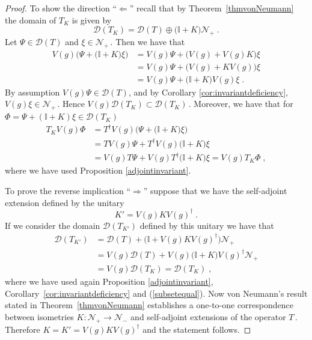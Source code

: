 \documentclass[a4paper,12pt]{amsart}
\newcommand{\D}{\mathcal{D}}
\newcommand{\1}{\mathbb{I}}
\numberwithin{equation}{section}
\numberwithin{theorem}{section}
\begin{document}
\begin{proof}%
To show the direction ``$\Leftarrow$'' recall that by
Theorem~\ref{thmvonNeumann} the domain of $T_K$ is given by
$$\D(T_K)=\D(T)\oplus\bigl(\mathbb{I}+K \bigr)\mathcal{N}_+\;.$$ Let $\Psi\in\D(T)$ and $\xi\in\mathcal{N}_+$\,. Then we have that
\begin{align*}
V(g)\bigl( \Psi + \bigl(\mathbb{I}+K\bigr)\xi \bigr)&=V(g)\Psi+ \bigl(V(g)+V(g)K\bigr)\xi\\
&=V(g)\Psi + \bigl(V(g)+KV(g)\bigr)\xi\\
&=V(g)\Psi+ \bigl(\mathbb{I}+K\bigr)V(g)\xi\;.
\end{align*}
By assumption $V(g)\Psi\in\D(T)$, and by Corollary \ref{cor:invariantdeficiency}, $V(g)\xi\in\mathcal{N_+}$\,. Hence $V(g)\D(T_K)\subset\D(T_K )$\,.
Moreover, we have that for $\Phi=\Psi+(\mathbb{I}+K)\xi\in\mathcal{D}(T_K)$
\begin{align*}
T_KV(g)\Phi&=T^\dagger V(g)\bigl(\Psi+\bigl(\mathbb{I}+K\bigr)\xi\bigr)\\
&=TV(g)\Psi+T^\dagger V(g)\bigl(\mathbb{I}+K\bigr)\xi\\
&=V(g)T\Psi + V(g)T^\dagger\bigl(\mathbb{I}+K\bigr)\xi=V(g)T_K\Phi\;,
\end{align*}
where we have used Proposition \ref{adjointinvariant}.

To prove the reverse implication ``$\Rightarrow$'' suppose that we have the self-adjoint extension defined by the unitary
$$K'=V(g)KV(g)^\dagger\;.$$
If we consider the domain $\D(T_{K'})$ defined by this unitary we have that
\begin{align*}
\D(T_{K'})&=\D(T) + \bigl(\mathbb{I}+V(g)KV(g)^\dagger\bigr)\mathcal{N}_+\\
&=V(g)\D(T) + V(g)\bigl(\mathbb{I}+K\bigr)V(g)^\dagger\mathcal{N}_+\\
&=V(g)\D(T_K)=\D(T_K)\;,
\end{align*}
where we have used again Proposition \ref{adjointinvariant}, Corollary~\ref{cor:invariantdeficiency} and 
(\ref{subsetequal}).
Now von Neumann's result stated in Theorem~\ref{thmvonNeumann} establishes a one-to-one correspondence between isometries
$K\colon\mathcal{N}_+\to\mathcal{N}_-$ and self-adjoint extensions of the operator $T$\,.
Therefore $K=K'=V(g)KV(g)^\dagger$ and the statement follows.
\end{proof}



\end{document}
